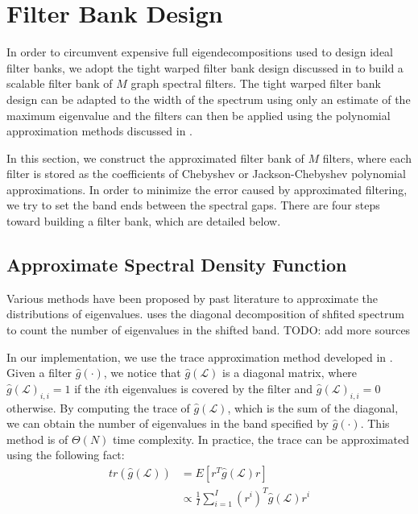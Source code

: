 \documentclass[a4paper]{article}
\newcommand{\La}{\mathcal{L}}
\theoremstyle{definition}
\begin{document}
\section{Filter Bank Design}

In order to circumvent expensive full eigendecompositions used to design ideal filter banks, we adopt the tight warped filter bank design discussed in \cite{shuman2013spectrum} to build a scalable filter bank of $M$ graph spectral filters. The tight warped filter bank design can be adapted to the width of the spectrum using only an estimate of the maximum eigenvalue and the filters can then be applied using the polynomial approximation methods discussed in \cite{hammond2011wavelets, shuman_DCOSS_2011}.

In this section, we construct the approximated filter bank of $M$ filters, where each filter is stored as the coefficients of Chebyshev or Jackson-Chebyshev polynomial approximations. In order to minimize the error caused by approximated filtering, we try to set the band ends between the spectral gaps. There are four steps toward building a filter bank, which are detailed below.

\subsection{Approximate Spectral Density Function}

Various methods have been proposed by past literature to approximate the distributions of eigenvalues. \cite{hammond2011wavelets,shuman_DCOSS_2011} uses the diagonal decomposition of shfited spectrum to count the number of eigenvalues in the shifted band. {\color{red}TODO: add more sources}

In our implementation,  we use the trace approximation method developed in \cite{approximating spectral densities of large matrices}. Given a filter $\hat{g}(\cdot)$, we notice that $\hat{g}(\La)$ is a diagonal matrix, where $\hat{g}(\La)_{i,i} = 1$ if the $i$th eigenvalues is covered by the filter and $\hat{g}(\La)_{i,i} = 0$ otherwise. By computing the trace of $\hat{g}(\La)$, which is the sum of the diagonal, we can obtain the number of eigenvalues in the band specified by $\hat{g}(\cdot)$. This method is of $\Theta(N)$ time complexity.
In practice, the trace can be approximated using the following fact:
\begin{align*}
tr(\hat{g}(\La)) &= E[r^T\hat{g}(\La)r] \\
&\propto \frac{1}{I}\sum_{i =1}^{I} (r^{i})^T\hat{g}(\La)r^{i}\\
\end{align*}
\end{document}
